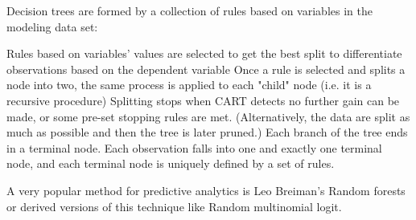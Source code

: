Decision trees are formed by a collection of rules based on variables in the modeling data set:

Rules based on variables' values are selected to get the best split to differentiate observations based on the dependent variable
Once a rule is selected and splits a node into two, the same process is applied to each "child" node (i.e. it is a recursive procedure)
Splitting stops when CART detects no further gain can be made, or some pre-set stopping rules are met. (Alternatively, the data are split as much as possible and then the tree is later pruned.)
Each branch of the tree ends in a terminal node. Each observation falls into one and exactly one terminal node, and each terminal node is uniquely defined by a set of rules.

A very popular method for predictive analytics is Leo Breiman's Random forests or derived versions of this technique like Random multinomial logit.

